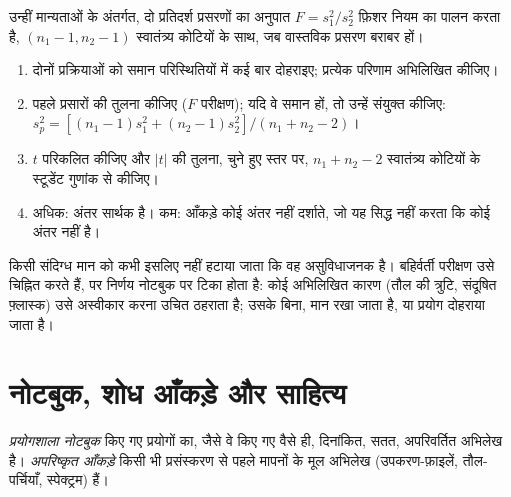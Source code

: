 \begin{proposition}[$F$ परीक्षण]\label{prop:b3:lab-techniques-3:f-test}
उन्हीं मान्यताओं के अंतर्गत, दो प्रतिदर्श प्रसरणों का अनुपात $F = s_1^2/s_2^2$
फ़िशर नियम का पालन करता है, $(n_1 - 1, n_2 - 1)$ स्वातंत्र्य कोटियों के साथ, जब वास्तविक प्रसरण बराबर हों।
\admitted
\end{proposition}

\begin{method}[क्या नई लब्धि बेहतर है?]\label{met:b3:lab-techniques-3:compare-means}
\begin{enumerate}
  \item दोनों प्रक्रियाओं को समान परिस्थितियों में कई बार दोहराइए; प्रत्येक
        परिणाम अभिलिखित कीजिए।
  \item पहले प्रसारों की तुलना कीजिए ($F$ परीक्षण); यदि वे समान हों, तो उन्हें संयुक्त कीजिए:
        $s_p^2 = [(n_1 - 1)s_1^2 + (n_2 - 1)s_2^2]/(n_1 + n_2 - 2)$।
  \item $t$ परिकलित कीजिए और $|t|$ की तुलना, चुने हुए स्तर पर, $n_1 + n_2 - 2$ स्वातंत्र्य
        कोटियों के स्टूडेंट गुणांक से कीजिए।
  \item अधिक: अंतर सार्थक है। कम: आँकड़े कोई अंतर नहीं दर्शाते,
        जो यह सिद्ध नहीं करता कि कोई अंतर नहीं है।
\end{enumerate}
\end{method}

किसी संदिग्ध मान को कभी इसलिए नहीं हटाया जाता कि वह असुविधाजनक है। बहिर्वर्ती परीक्षण
उसे चिह्नित करते हैं, पर निर्णय नोटबुक पर टिका होता है: कोई अभिलिखित कारण (तौल की
त्रुटि, संदूषित फ़्लास्क) उसे अस्वीकार करना उचित ठहराता है; उसके बिना, मान रखा जाता है,
या प्रयोग दोहराया जाता है।

\section{नोटबुक, शोध आँकड़े और साहित्य}

\begin{definition}[नोटबुक और अपरिष्कृत आँकड़े]\label{def:b3:lab-techniques-3:notebook}
\emph{प्रयोगशाला नोटबुक} किए गए प्रयोगों का, जैसे वे
किए गए वैसे ही, दिनांकित, सतत, अपरिवर्तित अभिलेख है। \emph{अपरिष्कृत
आँकड़े} किसी भी प्रसंस्करण से पहले मापनों के मूल अभिलेख (उपकरण-फ़ाइलें,
तौल-पर्चियाँ, स्पेक्ट्रम) हैं।
\end{definition}

